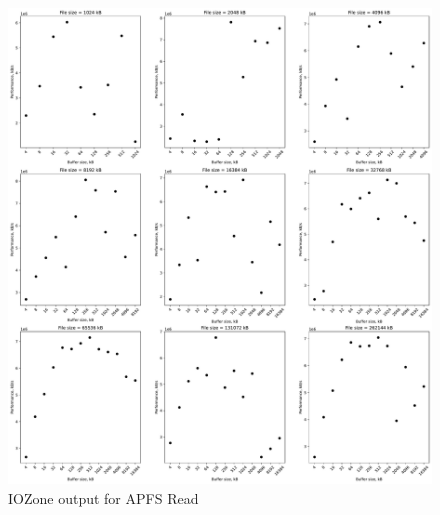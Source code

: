 \begin{figure}[!htb]
	\label{fig:bench_apfs_read}
	\begin{center}
		\includegraphics[width=1.0\textwidth]{figures/benchmarking/local/Read.pdf}
	\end{center}
	\caption{IOZone output for \gls{APFS} Read}
\end{figure}

